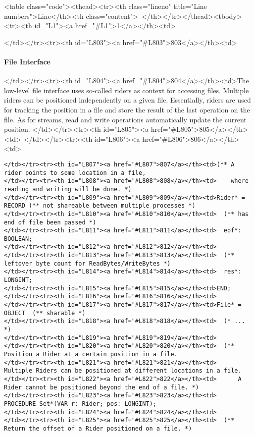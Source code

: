 <table class="code"><thead><tr><th class="lineno" title="Line numbers">Line</th><th class="content"> </th></tr></thead><tbody><tr><th id="L1"><a href="#L1">1</a></th><td>\documentclass[a4paper,11pt]{article}
\begin{document}
</td></tr><tr><th id="L803"><a href="#L803">803</a></th><td>\paragraph{File Interface}
</td></tr><tr><th id="L804"><a href="#L804">804</a></th><td>The low-level file interface uses so-called riders as context for accessing files. Multiple riders can be positioned independently on a given file. Essentially, riders are used for tracking the position in a file and store the result of the last operation on the file. As for streams, read and write operations automatically update the current position.
</td></tr><tr><th id="L805"><a href="#L805">805</a></th><td>
</td></tr><tr><th id="L806"><a href="#L806">806</a></th><td>\begin{lstlisting}[language=Oberon,frame=none,caption={Low-level Files API}]
</td></tr><tr><th id="L807"><a href="#L807">807</a></th><td>(** A rider points to some location in a file,
</td></tr><tr><th id="L808"><a href="#L808">808</a></th><td>    where reading and writing will be done. *)
</td></tr><tr><th id="L809"><a href="#L809">809</a></th><td>Rider* = RECORD (** not shareable between multiple processes *)
</td></tr><tr><th id="L810"><a href="#L810">810</a></th><td>  (** has end of file been passed *)
</td></tr><tr><th id="L811"><a href="#L811">811</a></th><td>  eof*: BOOLEAN;
</td></tr><tr><th id="L812"><a href="#L812">812</a></th><td>
</td></tr><tr><th id="L813"><a href="#L813">813</a></th><td>  (** leftover byte count for ReadBytes/WriteBytes *)
</td></tr><tr><th id="L814"><a href="#L814">814</a></th><td>  res*: LONGINT;
</td></tr><tr><th id="L815"><a href="#L815">815</a></th><td>END;
</td></tr><tr><th id="L816"><a href="#L816">816</a></th><td>
</td></tr><tr><th id="L817"><a href="#L817">817</a></th><td>File* = OBJECT  (** sharable *)
</td></tr><tr><th id="L818"><a href="#L818">818</a></th><td>  (* ... *)
</td></tr><tr><th id="L819"><a href="#L819">819</a></th><td>
</td></tr><tr><th id="L820"><a href="#L820">820</a></th><td>  (** Position a Rider at a certain position in a file.
</td></tr><tr><th id="L821"><a href="#L821">821</a></th><td>      Multiple Riders can be positioned at different locations in a file.
</td></tr><tr><th id="L822"><a href="#L822">822</a></th><td>      A Rider cannot be positioned beyond the end of a file. *)
</td></tr><tr><th id="L823"><a href="#L823">823</a></th><td>  PROCEDURE Set*(VAR r: Rider; pos: LONGINT);
</td></tr><tr><th id="L824"><a href="#L824">824</a></th><td>
</td></tr><tr><th id="L825"><a href="#L825">825</a></th><td>  (** Return the offset of a Rider positioned on a file. *)

\end{lstlisting}
\end{document}
